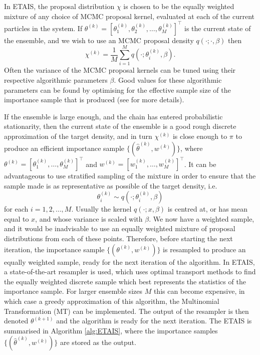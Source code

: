 \documentclass[final]{siamltex}
\begin{document}
In ETAIS, the proposal distribution $\chi$ is chosen to be the equally
weighted mixture of any choice of MCMC proposal kernel, evaluated at
each of the current particles in the system. If $\theta^{(k)} = [\theta_1^{(k)},
\theta_2^{(k)}, \ldots, \theta_M^{(k)}]^\top$ is the current state of the
ensemble, and we wish to use an MCMC proposal density $q(\cdot ;
\cdot, \beta)$ then 
\[\chi^{(k)} = \frac{1}{M} \sum_{i=1}^M q(\cdot ; \theta_i^{(k)}, \beta).\]
Often the variance of the MCMC proposal kernels can be tuned using
their respective algorithmic parameters $\beta$. Good values for these
algorithmic parameters can be
found by optimising for the effective sample size of the importance
sample that is produced (see \cite{cotter2015parallel, russ2017parallel} for more details).

If the ensemble is large enough, and the chain has entered
probabilistic stationarity, then the current state of the ensemble is
a good rough discrete approximation of the target density, and in turn
$\chi^{(k)}$ is close enough to $\pi$ to produce an efficient importance
sample $\{(\hat{\theta}^{(k)},w^{(k)})\}$,  where $\theta^{(k)} =
[\theta_1^{(k)}, \ldots, \theta_M^{(k)}]^\top$ and $w^{(k)} =
[w_1^{(k)}, \ldots, w_M^{(k)}]^\top$. It can be advantageous to use stratified sampling of the
mixture in order to
ensure that the sample made is as representative as possible of the
target density, i.e.
\[ \theta_i^{(k)} \sim q(\cdot ; \theta_i^{(k)},\beta)\]
for each $i = 1,2,\ldots,M$. Usually the kernel $q(\cdot ;
x,\beta)$ is centred at, or has mean equal to $x$, and whose variance
is scaled with $\beta$. We now have a weighted sample, and it
would be inadvisable to use an equally weighted mixture of proposal
distributions from each of these points. Therefore, before starting
the next iteration, the importance sample
$\{(\theta^{(k)},w^{(k)})\}$ is resampled to produce an equally
weighted sample, ready for the next iteration of the algorithm. In
ETAIS, a state-of-the-art resampler is used, which uses optimal
transport methods to find the equally weighted discrete sample which
best represents the statistics of the importance
sample\cite{reich2013nonparametric}. For larger ensemble sizes $M$ this can become
expensive, in which case a greedy approximation of this algorithm, the
Multinomial Transformation (MT) can be
implemented\cite{cotter2015parallel}. The output of the resampler is then denoted
$\theta^{(k+1)}$ and the algorithm is ready for the next
iteration. The ETAIS is summarised in Algorithm \ref{alg:ETAIS}, where
the importance samples $\{(\hat{\theta}^{(k)},w^{(k)})\}$ are stored as
the output.
\end{document}
